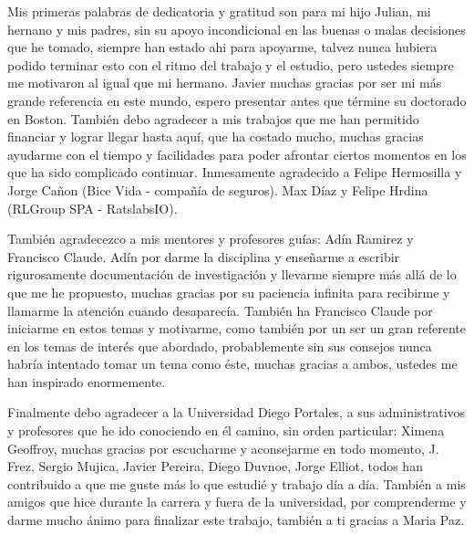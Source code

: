 
Mis primeras palabras de dedicatoria  y gratitud son para mi hijo Julian, mi hernano y mis padres, sin su apoyo incondicional en las buenas o malas decisiones que he tomado, siempre han estado ahi para apoyarme, talvez nunca hubiera podido terminar esto con el ritmo del trabajo y el estudio, pero ustedes siempre me motivaron al igual que mi hermano.  Javier muchas gracias por ser mi más grande referencia en este mundo, espero presentar antes que términe su doctorado en Boston. También debo agradecer a mis trabajos que me han permitido financiar y lograr llegar hasta aquí, que ha costado mucho, muchas gracias  ayudarme con el tiempo y facilidades para poder afrontar ciertos momentos en los que ha sido complicado continuar. Inmesamente agradecido a  Felipe Hermosilla y Jorge Cañon (Bice Vida - compañía de seguros). Max Díaz y Felipe Hrdina (RLGroup SPA - RatslabsIO).

También agradecezco a mis mentores y profesores guías: Adín Ramirez y Francisco Claude. Adín por darme la disciplina y enseñarme a escribir rigurosamente documentación de investigación y llevarme siempre más allá de lo que me he propuesto, muchas gracias por su paciencia infinita para recibirme y llamarme la atención cuando desaparecía. También ha Francisco Claude por iniciarme en estos temas y motivarme, como también por un ser un gran referente en los temas de interés que abordado, probablemente sin sus consejos nunca habría intentado tomar un tema como éste, muchas gracias a ambos, ustedes me han inspirado enormemente. 

Finalmente debo agradecer a la Universidad Diego Portales, a sus administrativos y profesores que he ido conociendo en él camino, sin orden particular: Ximena Geoffroy, muchas gracias por escucharme y aconsejarme en todo momento, J. Frez, Sergio Mujica, Javier Pereira, Diego Duvnoe, Jorge Elliot, todos han contribuido a que me guste más lo que estudié y trabajo día a día. También a mis amigos que hice durante la carrera y fuera de la universidad, por comprenderme y darme mucho ánimo para finalizar este trabajo, también a ti gracias a Maria Paz.
